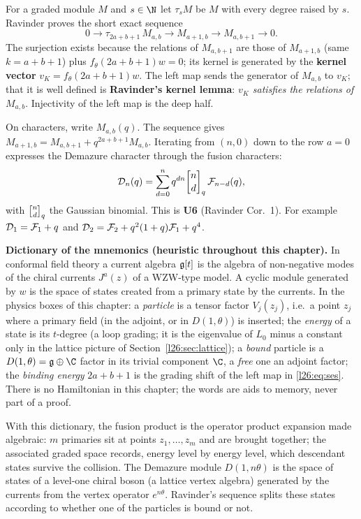 For a graded module $M$ and $s\in\N$ let $\tau_sM$ be $M$ with every degree raised by $s$. Ravinder proves the short exact
sequence
\begin{equation}\label{l26:eq:ses}
0\longrightarrow \tau_{2a+b+1}\,M_{a,b}\longrightarrow M_{a+1,b}\longrightarrow M_{a,b+1}\longrightarrow 0 .
\end{equation}
The surjection exists because the relations of $M_{a,b+1}$ are those of $M_{a+1,b}$ (same $k=a+b+1$) plus
$f_\theta(2a+b+1)w=0$; its kernel is generated by the \textbf{kernel vector} $v_K=f_\theta(2a+b+1)w$. The left map sends the
generator of $M_{a,b}$ to $v_K$; that it is well defined is \textbf{Ravinder's kernel lemma}: \emph{$v_K$ satisfies the relations
of $M_{a,b}$}. Injectivity of the left map is the deep half.

On characters, write $M_{a,b}(q)$. The sequence gives $M_{a+1,b}=M_{a,b+1}+q^{2a+b+1}M_{a,b}$. Iterating from $(n,0)$
down to the row $a=0$ expresses the Demazure character through the fusion characters:
\begin{equation}\label{l26:eq:mixed}
\ltwentysixD_n(q)=\sum_{d=0}^{n}q^{dn}\ltwentysixqb nd\,\ltwentysixF_{n-d}(q),
\end{equation}
with $\ltwentysixqb nd$ the Gaussian binomial. This is \textbf{U6} (Ravinder Cor.~1). For example
$\mathcal D_1=\mathcal F_1+q$ and $\mathcal D_2=\mathcal F_2+q^2(1+q)\mathcal F_1+q^4$.

\begin{physics}
\textbf{Dictionary of the mnemonics (heuristic throughout this chapter).} In conformal field theory a current algebra
$\mathfrak g[t]$ is the algebra of non-negative modes of the chiral currents $J^a(z)$ of a WZW-type model. A cyclic module
generated by $w$ is the space of states created from a primary state by the currents. In the physics boxes of this chapter:
a \emph{particle} is a tensor factor $V_j(z_j)$, i.e.\ a point $z_j$ where a primary field (in the adjoint, or in $D(1,\theta)$) is
inserted; the \emph{energy} of a state is its $t$-degree (a loop grading; it is the eigenvalue of $L_0$ minus a constant only in
the lattice picture of Section~\ref{l26:sec:lattice}); a \emph{bound} particle is a $D(1,\theta)=\ltwentysixg\oplus\C$ factor in its
trivial component $\C$, a \emph{free} one an adjoint factor; the \emph{binding energy} $2a+b+1$ is the grading shift of the left map
in \eqref{l26:eq:ses}. There is no Hamiltonian in this chapter; the words are aids to memory, never part of a proof.

With this dictionary, the fusion product is the operator product expansion made algebraic: $m$ primaries sit at points
$z_1,\dots,z_m$ and are brought together; the associated graded space records, energy level by energy level, which
descendant states survive the collision. The Demazure module $D(1,n\theta)$ is the space of states of a level-one chiral boson
(a lattice vertex algebra) generated by the currents from the vertex operator $e^{n\theta}$. Ravinder's sequence splits these
states according to whether one of the particles is bound or not.
\end{physics}

